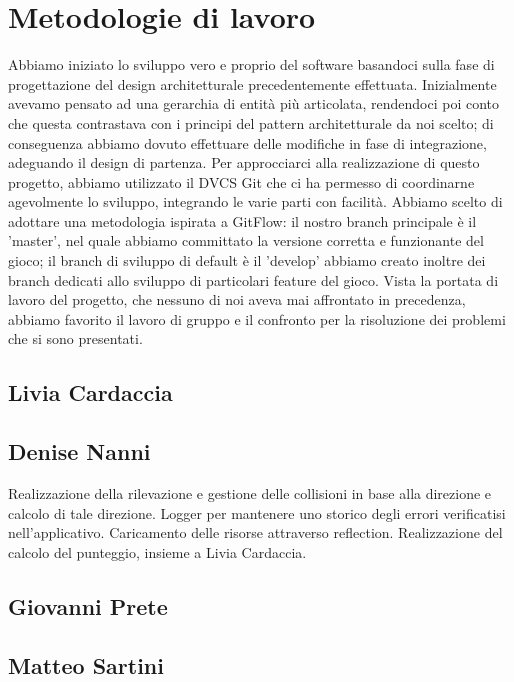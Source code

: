 \documentclass[a4paper,12pt]{report}
\begin{document}
\section{Metodologie di lavoro}
Abbiamo iniziato lo sviluppo vero e proprio del software basandoci sulla fase di progettazione del design architetturale precedentemente effettuata. Inizialmente avevamo pensato ad una gerarchia di entità più articolata, rendendoci poi conto che questa contrastava con i principi del pattern architetturale da noi scelto; di conseguenza abbiamo dovuto effettuare delle modifiche in fase di integrazione, adeguando il design di partenza.
Per approcciarci alla realizzazione di questo progetto, abbiamo utilizzato il DVCS Git che ci ha permesso di coordinarne agevolmente lo sviluppo, integrando le varie parti con facilità. Abbiamo scelto di adottare una metodologia ispirata a GitFlow: il nostro branch principale è il 'master', nel quale abbiamo committato la versione corretta e funzionante del gioco; il branch di sviluppo di default è il 'develop' abbiamo creato inoltre dei branch dedicati allo sviluppo di particolari feature del gioco.
Vista la portata di lavoro del progetto, che nessuno di noi aveva mai affrontato in precedenza, abbiamo favorito il lavoro di gruppo e il confronto per la risoluzione dei problemi che si sono presentati.

\subsection{Livia Cardaccia}

\subsection{Denise Nanni}
Realizzazione della rilevazione e gestione delle collisioni in base alla direzione e calcolo di tale direzione.
Logger per mantenere uno storico degli errori verificatisi nell'applicativo.
Caricamento delle risorse attraverso reflection.
Realizzazione del calcolo del punteggio, insieme a Livia Cardaccia.

\subsection{Giovanni Prete}

\subsection{Matteo Sartini}
\end{document}
